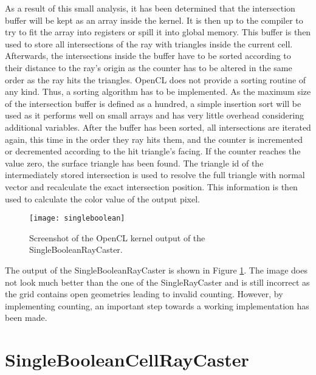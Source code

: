 As a result of this small analysis, it has been determined that the intersection buffer will be kept as an array inside the kernel. It is then up to the compiler to try to fit the array into registers or spill it into global memory. This buffer is then used to store all intersections of the ray with triangles inside the current cell. Afterwards, the intersections inside the buffer have to be sorted according to their distance to the ray's origin as the counter has to be altered in the same order as the ray hits the triangles. OpenCL does not provide a sorting routine of any kind. Thus, a sorting algorithm has to be implemented. As the maximum size of the intersection buffer is defined as a hundred, a simple insertion sort will be used as it performs well on small arrays and has very little overhead considering additional variables. After the buffer has been sorted, all intersections are iterated again, this time in the order they ray hits them, and the counter is incremented or decremented according to the hit triangle's facing. If the counter reaches the value zero, the surface triangle has been found. The triangle id of the intermediately stored intersection is used to resolve the full triangle with normal vector and recalculate the exact intersection position. This information is then used to calculate the color value of the output pixel.

\begin{figure}[h]
\centering
\texttt{[image: singleboolean]}
\caption{Screenshot of the OpenCL kernel output of the SingleBooleanRayCaster.}
\label{fig:singleboolean}
\end{figure}

The output of the SingleBooleanRayCaster is shown in Figure \ref{fig:singleboolean}. The image does not look much better than the one of the SingleRayCaster and is still incorrect as the grid contains open geometries leading to invalid counting. However, by implementing counting, an important step towards a working implementation has been made.

\section{SingleBooleanCellRayCaster}
\label{sec:single_boolean_cell}

